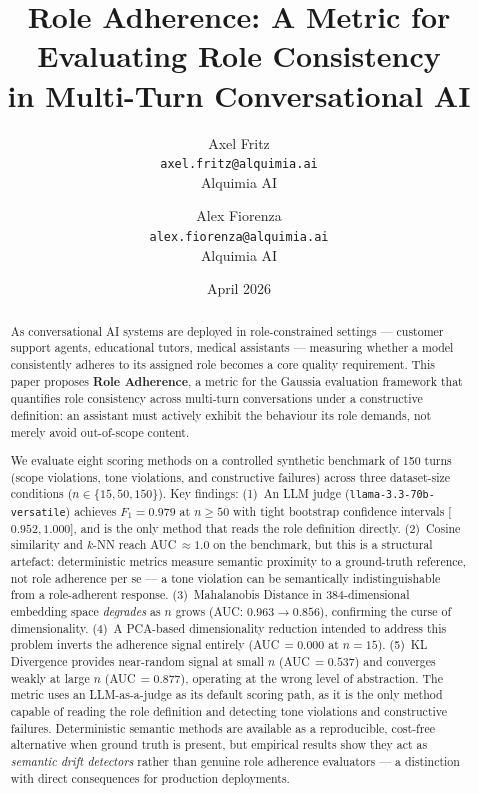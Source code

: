 \documentclass[11pt,a4paper]{article}
\title{\textbf{Role Adherence: A Metric for Evaluating Role Consistency\\
in Multi-Turn Conversational AI}}
\author{
    Axel Fritz\\
    \texttt{axel.fritz@alquimia.ai}\\
    Alquimia AI
    \and
    Alex Fiorenza\\
    \texttt{alex.fiorenza@alquimia.ai}\\
    Alquimia AI
}
\date{April 2026}
\begin{document}
\maketitle

\begin{abstract}
As conversational AI systems are deployed in role-constrained settings ---
customer support agents, educational tutors, medical assistants --- measuring
whether a model consistently adheres to its assigned role becomes a core quality
requirement. This paper proposes \textbf{Role Adherence}, a metric for the
Gaussia evaluation framework that quantifies role consistency across multi-turn
conversations under a constructive definition: an assistant must actively exhibit
the behaviour its role demands, not merely avoid out-of-scope content.

We evaluate eight scoring methods on a controlled synthetic benchmark of
150 turns (scope violations, tone violations, and constructive failures)
across three dataset-size conditions ($n \in \{15, 50, 150\}$). Key findings:
(1)~An LLM judge (\texttt{llama-3.3-70b-versatile}) achieves $F_1 = 0.979$
at $n \geq 50$ with tight bootstrap confidence intervals [$0.952$,\,$1.000$],
and is the only method that reads the role definition directly.
(2)~Cosine similarity and $k$-NN reach AUC\,$\approx 1.0$ on the benchmark,
but this is a structural artefact: deterministic metrics measure semantic
proximity to a ground-truth reference, not role adherence per se --- a tone
violation can be semantically indistinguishable from a role-adherent response.
(3)~Mahalanobis Distance in 384-dimensional embedding space \emph{degrades}
as $n$ grows (AUC: $0.963 \to 0.856$), confirming the curse of dimensionality.
(4)~A PCA-based dimensionality reduction intended to address this problem
inverts the adherence signal entirely (AUC\,$= 0.000$ at $n = 15$).
(5)~KL Divergence provides near-random signal at small $n$ (AUC\,$= 0.537$)
and converges weakly at large $n$ (AUC\,$= 0.877$), operating at the wrong
level of abstraction. The metric uses an LLM-as-a-judge as its default scoring path, as it is
the only method capable of reading the role definition and detecting tone
violations and constructive failures. Deterministic semantic methods are
available as a reproducible, cost-free alternative when ground truth is
present, but empirical results show they act as \emph{semantic drift
detectors} rather than genuine role adherence evaluators --- a distinction
with direct consequences for production deployments.
\end{abstract}
\end{document}
